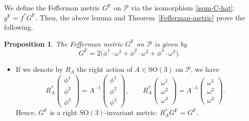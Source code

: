 \documentclass[11pt]{article}
\numberwithin{equation}{section}
\numberwithin{equation}{section}
\newtheorem{Proposition}[Theorem]{Proposition}
 { \theoremstyle{definition}
\newtheorem{Definition}[Theorem]{Definition}
\newtheorem*{Notation}{Notation}
\newtheorem{Example}[Theorem]{Example}
\newtheorem{Remark}[Theorem]{Remark} }
\begin{document}
We define the Fefferman metric $G^{\mathrm{F}}$ on $\mathcal{P}$ via the isomorphism \eqref{isom-C-hat}: $g^{\mathrm{F}}=f^* G^{\mathrm{F}}$. Then, the above lemma and Theorem~\ref{Fefferman-metric} prove the following.

\begin{Proposition}
The Fefferman metric $G^{\mathrm{F}}$ on $\mathcal{P}$ is given by
\[
G^{\mathrm{F}}=2\bigl( \phi^1\cdot\omega^1+ \phi^2\cdot\omega^2+ \phi^3\cdot\omega^3\bigr).
\]
\end{Proposition}

\begin{Remark}\quad
\begin{itemize}\itemsep=0pt
\item[(i)]
If we denote by $R_A$ the right action of $A\in\mathrm{SO}(3)$ on $\mathcal{P}$, we have
\[
R_A^*\begin{pmatrix}
\phi^1 \\ \phi^2 \\ \phi^3
\end{pmatrix}=A^{-1}\begin{pmatrix}
\phi^1 \\ \phi^2 \\ \phi^3
\end{pmatrix}, \qquad R_A^*\begin{pmatrix}
\omega^1 \\ \omega^2 \\ \omega^3
\end{pmatrix}=A^{-1}\begin{pmatrix}
\omega^1 \\ \omega^2 \\ \omega^3
\end{pmatrix}.
\]
Hence, $G^{\mathrm{F}}$ is a right $\mathrm{SO}(3)$-invariant metric: $R_A^*G^{\mathrm{F}}=G^{\mathrm{F}}$.


\end{itemize}
\end{Remark}
\end{document}
